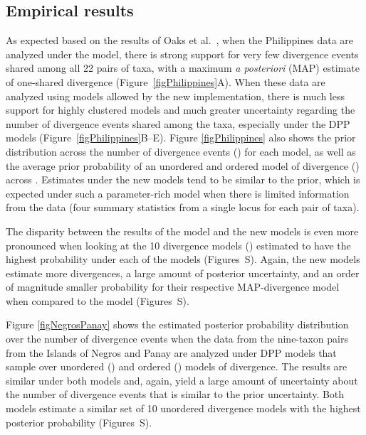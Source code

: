 \subsection{Empirical results}
As expected based on the results of Oaks et al.\ \cite{Oaks2012}, when the
Philippines data are analyzed under the \empModelOld model, there is strong
support for very few divergence events shared among all 22 pairs of taxa, with
a maximum \emph{a posteriori} (MAP) estimate of one-shared divergence
(Figure~\ref{figPhilippines}A).
When these data are analyzed using models allowed by the new implementation,
there is much less support for highly clustered models and much greater
uncertainty regarding the number of divergence events shared among the taxa,
especially under the DPP models (Figure~\ref{figPhilippines}B--E).
Figure \ref{figPhilippines} also shows the prior distribution across the number
of divergence events (\divTimeNum) for each model, as well as the
average prior probability of an unordered and ordered model of divergence
(\divTimeIndexVector) across \divTimeNum.
Estimates under the new models tend to be similar to the prior, which is
expected under such a parameter-rich model when there is limited information
from the data (four summary statistics from a single locus for each pair of
taxa).

The disparity between the results of the \empModelOld model and the new models
is even more pronounced when looking at the 10 divergence models
(\divTimeIndexVector) estimated to have the highest probability under each of the
models
(Figures~S).
Again, the new models estimate more divergences, a large amount of posterior
uncertainty, and an order of magnitude smaller probability for their respective
MAP-divergence model when compared to the \empModelOld model
(Figures~S).

Figure \ref{figNegrosPanay} shows the estimated posterior probability
distribution over the number of divergence events when the data from the
nine-taxon pairs from the Islands of Negros and Panay are analyzed under DPP
models that sample over unordered (\npModelDPP) and ordered
(\npModelDPPOrdered) models of divergence.
The results are similar under both models and, again, yield a large amount of
uncertainty about the number of divergence events that is similar to the prior
uncertainty.
Both models estimate a similar set of 10 unordered divergence models with the
highest posterior probability
(Figures~S).

